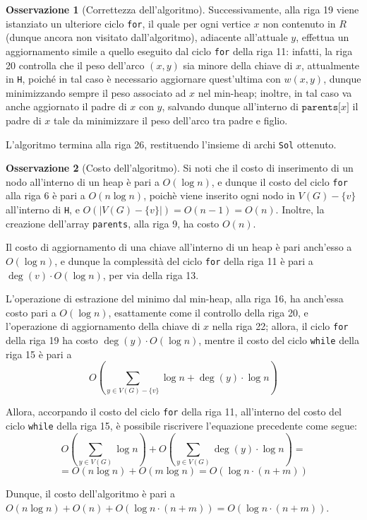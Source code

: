 \documentclass[14pt]{extreport}
\theoremstyle{definition}
\theoremstyle{definition}
\newtheorem{remark}{Osservazione}[subsection]
\begin{document}
\begin{remark}[Correttezza dell'algoritmo]
    Successivamente, alla riga 19 viene istanziato un ulteriore ciclo \texttt{for}, il quale per ogni vertice $x$ non contenuto in $R$ (dunque ancora non visitato dall'algoritmo), adiacente all'attuale $y$, effettua un aggiornamento simile a quello eseguito dal ciclo \texttt{for} della riga 11: infatti, la riga 20 controlla che il peso dell'arco $(x, y)$ sia minore della chiave di $x$, attualmente in \texttt{H}, poiché in tal caso è necessario aggiornare quest'ultima con $w(x, y)$, dunque minimizzando sempre il peso associato ad $x$ nel min-heap; inoltre, in tal caso va anche aggiornato il padre di $x$ con $y$, salvando dunque all'interno di $\texttt{parents[}x\texttt{]}$ il padre di $x$ tale da minimizzare il peso dell'arco tra padre e figlio.

    L'algoritmo termina alla riga 26, restituendo l'insieme di archi \texttt{Sol} ottenuto.
\end{remark}

\begin{remark}[Costo dell'algoritmo]
    Si noti che il costo di inserimento di un nodo all'interno di un heap è pari a $O(\log n)$, e dunque il costo del ciclo \texttt{for} alla riga 6 è pari a $O (n \log n)$, poichè viene inserito ogni nodo in $V(G) - \{v\}$ all'interno di \texttt{H}, e $O(|V(G) - \{v\}|) = O(n - 1) = O(n)$. Inoltre, la creazione dell'array \texttt{parents}, alla riga 9, ha costo $O(n)$.

    Il costo di aggiornamento di una chiave all'interno di un heap è pari anch'esso a $O(\log n)$, e dunque la complessità del ciclo \texttt{for} della riga 11 è pari a $\deg(v) \cdot O(\log n)$, per via della riga 13.

    L'operazione di estrazione del minimo dal min-heap, alla riga 16, ha anch'essa costo pari a $O(\log n)$, esattamente come il controllo della riga 20, e l'operazione di aggiornamento della chiave di $x$ nella riga 22; allora, il ciclo \texttt{for} della riga 19 ha costo $\deg(y) \cdot O(\log n)$, mentre il costo del ciclo \texttt{while} della riga 15 è pari a $$\displaystyle O\left(\sum_{y \in V(G) - \{v\}}{\log n + \deg(y) \cdot \log n}\right)$$

    Allora, accorpando il costo del ciclo \texttt{for} della riga 11, all'interno del costo del ciclo \texttt{while} della riga 15, è possibile riscrivere l'equazione precedente come segue: $$\displaystyle O\left(\sum_{y \in V(G)} {\log n}\right) + O \left(\sum_{y \in V(G)}{\deg(y) \cdot \log n}\right) = $$ $$= O(n \log n ) + O(m \log n) = O(\log n \cdot( n + m))$$

    Dunque, il costo dell'algoritmo è pari a $O(n \log n) + O(n) + O(\log n \cdot (n + m)) = O(\log n \cdot (n + m))$.
\end{remark}
\end{document}
